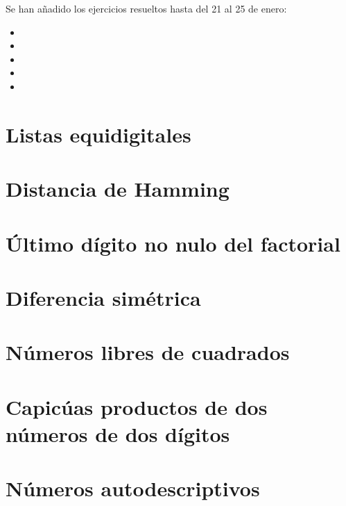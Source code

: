\documentclass[a4paper,12pt,twoside]{book}
\begin{document}
Se han añadido los ejercicios resueltos hasta del 21 al 25 de enero:

\begin{itemize}
\item {}
\item {}
\item {}
\item {}
\item {}
\end{itemize}

\chapter{Listas equidigitales}

\chapter{Distancia de Hamming}

\chapter{Último dígito no nulo del factorial}

\chapter{Diferencia simétrica}

\chapter{Números libres de cuadrados}

\chapter{Capicúas productos de dos números de dos dígitos}

 
\chapter{Números autodescriptivos}
\end{document}

